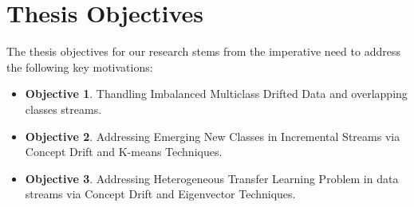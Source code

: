 \section{Thesis Objectives}
\label{sec:1_introduction_objectives}
The thesis objectives for our research stems from the imperative need to address the following key motivations:
\begin{itemize}
    \item \textbf{Objective 1}. Thandling Imbalanced Multiclass Drifted Data and overlapping classes streams.
    \item \textbf{Objective 2}. Addressing Emerging New Classes in Incremental Streams via Concept Drift and K-means Techniques.
    \item \textbf{Objective 3}. Addressing Heterogeneous Transfer Learning Problem in data streams via Concept Drift and Eigenvector Techniques.
\end{itemize}
